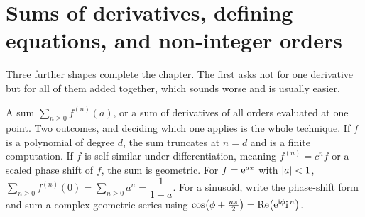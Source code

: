 \section{Sums of derivatives, defining equations, and non-integer orders}

Three further shapes complete the chapter. The first asks not for one derivative but for all of them added together, which sounds worse and is usually easier.

\cue A sum $\sum_{n\geq0}f^{(n)}(a)$, or a sum of derivatives of all orders evaluated at one point.
\method Two outcomes, and deciding which one applies is the whole technique. If $f$ is a polynomial of degree $d$, the sum truncates at $n=d$ and is a finite computation. If $f$ is self-similar under differentiation, meaning $f^{(n)}=c^{n}f$ or a scaled phase shift of $f$, the sum is geometric. For $f=\mathrm{e}^{ax}$ with $\left\lvert a\right\rvert<1$, $\sum_{n\geq0}f^{(n)}(0)=\sum_{n\geq0}a^{n}=\dfrac{1}{1-a}$. For a sinusoid, write the phase-shift form and sum a complex geometric series using $\cos\bigl(\phi+\tfrac{n\pi}{2}\bigr)=\operatorname{Re}\bigl(\mathrm{e}^{\mathrm{i}\phi}\mathrm{i}^{\,n}\bigr)$.


